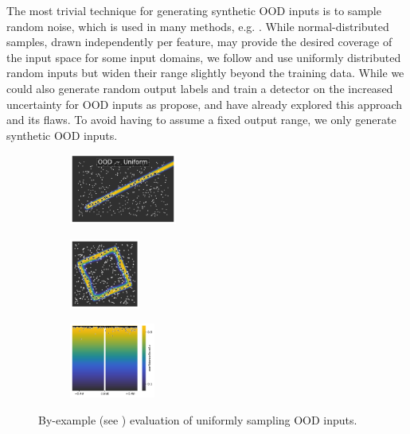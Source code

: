 The most trivial technique for generating synthetic OOD inputs is to sample random noise, which is used in many methods, e.g. \cite{ood-class-2022, ood-boundary-2021, ood-training-2017, ood-exposure-confidence-2021, learning-ood-confidence-2018, noise-contrastive-uq-2020}. While normal-distributed samples, drawn independently per feature, may provide the desired coverage of the input space for some input domains, we follow \textcite{ood-boundary-2021} and use uniformly distributed random inputs but widen their range slightly beyond the training data. While we could also generate random output labels and train a detector on the increased uncertainty for OOD inputs as \textcite{noise-contrastive-uq-2020} propose,  and  have already explored this approach and its flaws. To avoid having to assume a fixed output range, we only generate synthetic OOD inputs.

\begin{figure}[H]
    \centering
    \begin{subfigure}
        \centering
        \includegraphics[width=0.388\textwidth,valign=t]{ood-detection/figures/ood-synthesis/ood-line-uniform.pdf}
    \end{subfigure}
    \begin{subfigure}
        \centering
        \includegraphics[width=0.254\textwidth,valign=t]{ood-detection/figures/ood-synthesis/ood-circle-uniform.pdf}
    \end{subfigure}
    \begin{subfigure}
        \centering
        \includegraphics[width=0.308\textwidth,valign=t]{ood-detection/figures/ood-synthesis/ood-haystack-uniform.pdf}
    \end{subfigure}

    \caption[Random Synthetic OOD Samples]{By-example (see ) evaluation of uniformly sampling OOD inputs.}
    \label{fig:uniform-ood-samples}
\end{figure}

